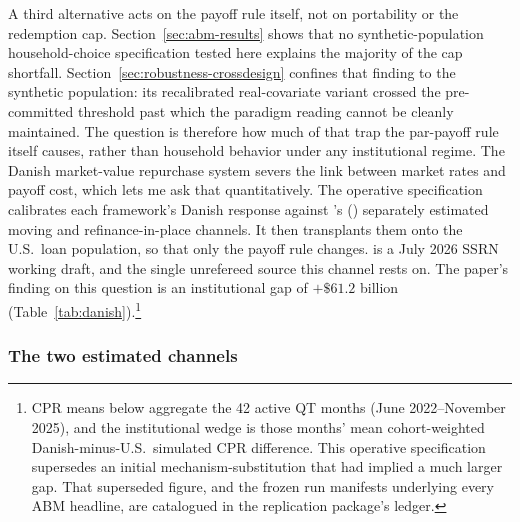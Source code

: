 \documentclass[12pt]{article}
\newcommand{\citepos}[1]{\citeauthor{#1}'s (\citeyear{#1})}
\begin{document}
A third alternative acts on the payoff rule itself, not on portability or the redemption cap. Section~\ref{sec:abm-results} shows that no synthetic-population household-choice specification tested here explains the majority of the cap shortfall. Section~\ref{sec:robustness-crossdesign} confines that finding to the synthetic population: its recalibrated real-covariate variant crossed the pre-committed threshold past which the paradigm reading cannot be cleanly maintained. The question is therefore how much of that trap the par-payoff rule itself causes, rather than household behavior under any institutional regime. The Danish market-value repurchase system severs the link between market rates and payoff cost, which lets me ask that quantitatively. The operative specification calibrates each framework's Danish response against \citepos{berger2026} separately estimated moving and refinance-in-place channels. It then transplants them onto the U.S.\ loan population, so that only the payoff rule changes. \citet{berger2026} is a July 2026 SSRN working draft, and the single unrefereed source this channel rests on. The paper's finding on this question is an institutional gap of $+\$61.2$ billion (Table~\ref{tab:danish}).\footnote{\label{fn:manifest}CPR means below aggregate the 42 active QT months (June 2022--November 2025), and the institutional wedge is those months' mean cohort-weighted Danish-minus-U.S.\ simulated CPR difference. This operative specification supersedes an initial mechanism-substitution that had implied a much larger gap. That superseded figure, and the frozen run manifests underlying every ABM headline, are catalogued in the replication package's ledger.}

\subsubsection{The two estimated channels}
\end{document}

